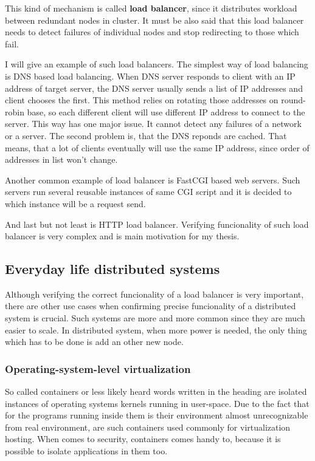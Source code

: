 \documentclass[
  master,
  biblatex,
  glossaries,
  index
]{kidiplom}
\begin{document}
This kind of mechanism is called {\bf load balancer}, since it distributes workload between redundant nodes in cluster. It must be also said that this load balancer needs to detect failures of individual nodes and stop redirecting to those which fail.


I will give an example of such load balancers. The simplest way of load balancing is DNS based load balancing. When DNS server responds to client with an IP address of target server, the DNS server usually sends a list of IP addresses and client chooses the first. This method relies on rotating those addresses on round-robin base, so each different client will use different IP address to connect to the server. This way has one major issue. It cannot detect any failures of a network or a server. The second problem is, that the DNS reponds are cached. That means, that a lot of clients eventually will use the same IP address, since order of addresses in list won't change. %

Another common example of load balancer is FastCGI based web servers. Such servers run several reusable instances of same CGI script and it is decided to which instance will be a request send.

And last but not least is HTTP load balancer. Verifying funcionality of such load balancer is very complex and is main motivation for my thesis. %

\subsection{Everyday life distributed systems}

Although verifying the correct funcionality of a load balancer is very important, there are other use cases when confirming precise funcionality of a distributed system is crucial. Such systems are more and more common since they are much easier to scale. In distributed system, when more power is needed, the only thing which has to be done is add an other new node. %

\subsubsection{Operating-system-level virtualization}

So called containers or less likely heard words written in the heading are isolated instances of operating systems kernels running in user-space. Due to the fact that for the programs running inside them is their environment almost unrecognizable from real environment, are such containers used commonly for virtualization hosting. When comes to security, containers comes handy to, because it is possible to isolate applications in them too. %
\end{document}
